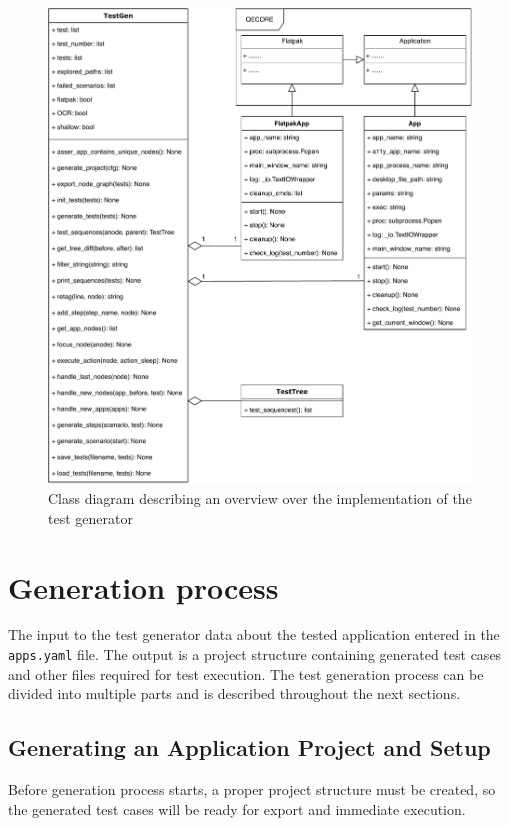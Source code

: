 \begin{figure}[hbt]
	\centering
	\includegraphics[width=1\textwidth,clip]{obrazky-figures/TestGen_class_diagram.pdf}
	\caption{Class diagram describing an overview over the implementation of the test generator}
	\label{test_gen}
\end{figure}

\section{Generation process}
The input to the test generator data about the tested application entered in the \texttt{apps.yaml} file. The output is a project structure containing generated test cases and other files required for test execution. The test generation process can be divided into multiple parts and is described throughout the next sections.

\subsection{Generating an Application Project and Setup}
Before generation process starts, a proper project structure must be created, so the generated test cases will be ready for export and immediate execution.



